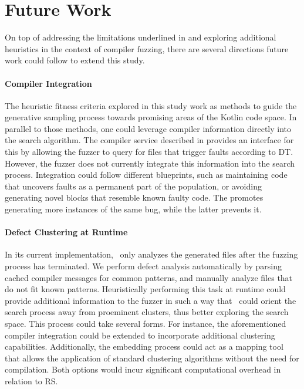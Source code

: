 \section{\label{sec:future}Future Work}

On top of addressing the limitations underlined in  and exploring
additional heuristics in the context of compiler fuzzing,
there are several directions future work could follow to extend this study.

\paragraph{Compiler Integration}
The heuristic fitness
criteria explored in this study work as methods
to guide the generative sampling process towards
promising areas of the Kotlin code space.
In parallel to those methods, one could leverage compiler information
directly into the search algorithm.
The compiler service described in  provides
an interface for this by allowing the fuzzer
to query for files that trigger faults according to \gls{DT}.
However, the fuzzer does not currently integrate this information into the search process.
Integration could follow different blueprints, such as maintaining code that uncovers faults as a permanent part of the population,
or avoiding generating novel blocks that resemble
known faulty code.
The promotes generating more instances of the same bug,
while the latter prevents it.

\paragraph{Defect Clustering at Runtime}
In its current implementation, \kf~only analyzes the generated files
after the fuzzing process has terminated.
We perform defect analysis automatically by parsing cached compiler messages
for common patterns, and manually analyze files that do not fit known patterns.
Heuristically performing this task at runtime could provide additional information to the fuzzer
in such a way that \kf~could orient the search process away from proeminent clusters,
thus better exploring the search space.
This process could take several forms.
For instance, the aforementioned compiler integration could be extended
to incorporate additional clustering capabilities.
Additionally, the embedding process could act as a mapping
tool that allows the application of standard clustering algorithms
without the need for compilation.
Both options would incur significant computational overhead in relation to \gls{RS}.

